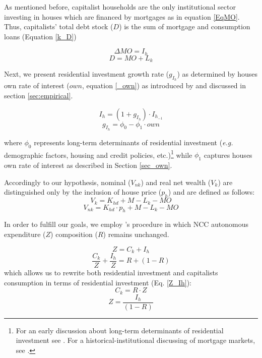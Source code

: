 \documentclass[12pt, a4]{article}
\begin{document}
As mentioned before, capitalist households are the only institutional sector investing in houses which are financed by mortgages as in equation \ref{EqMO}.
Thus, capitalists' total debt stock (\(D\)) is the sum of mortgage and consumption loans (Equation \ref{k_D})

\begin{equation}
  \label{EqMO}
  \Delta MO = I_h
\end{equation}
\begin{equation}
  \label{k_D}
  D =  MO + L_k
\end{equation}



Next, we present residential investment growth rate (\(g_{I_h}\)) as determined by houses own rate of interest (\(own\), equation \ref{_own}) as introduced by \textcite{teixeira_crescimento_2015} and discussed in section \ref{sec:empirical}.


\begin{equation}
	I_h = (1 + g_{I_h})\cdot I_{h_{-1}}
\end{equation}
\begin{equation}
	\label{g_Z_own}
	g_{I_h} = \phi_0 - \phi_1\cdot own
\end{equation}

where  \(\phi_0\) represents long-term determinants of residential investment (\emph{e.g.} demographic factors, housing and credit policies, etc.)\footnote{For an early discussion about long-term determinants of residential investment see \textcite{grebler_capital_1956}. For a historical-institutional discussing of mortgage markets, see \textcite{green_american_2005}.} while \(\phi_1\) captures houses own rate of interest as described in Section \ref{sec_own}.

Accordingly to our hypothesis, nominal (\(V_{nk}\)) and real net wealth (\(V_{k}\)) are distinguished only by the inclusion of house price (\(p_h\)) and are defined as follows:
\begin{equation}
V_{k} = K_{hd} + M - L_{k} - MO
\end{equation}
\begin{equation}
V_{nk} = K_{hd}\cdot p_h + M - L_{k} - MO
\end{equation}


In order to fulfill our goals, we employ \citeauthor*{freitas_baseline_2020}'s \citeyear{freitas_baseline_2020} procedure in which NCC autonomous expenditure (\(Z\)) composition (\(R\)) remains unchanged.

\begin{equation}
\label{_Z}
Z = C_k + I_h
\end{equation}
$$
\frac{C_k}{Z} + \frac{I_h}{Z} = R + (1-R)
$$
which allows us to rewrite both residential investment and capitalists consumption in terms of residential investment (Eq. \ref{Z_Ih}):
\begin{equation}
\label{_Ck}
    C_k = R\cdot Z
\end{equation}
\begin{equation}
\label{Z_Ih}
Z = \frac{I_h}{(1-R)}
\end{equation}
\end{document}
